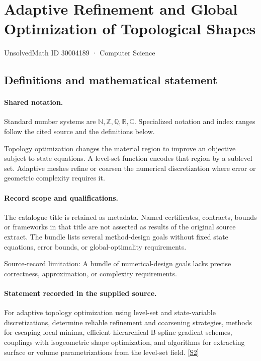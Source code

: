 \documentclass[11pt]{article}
\newcommand{\sref}[2]{\hyperlink{source:#1:#2}{[S#2]}}
\begin{document}
\setcounter{section}{30004188}
\section{Adaptive Refinement and Global Optimization of Topological Shapes}\label{30004189}
{\small\sffamily UnsolvedMath ID 30004189 · Computer Science}
\subsection{Definitions and mathematical statement}

\paragraph{Shared notation.}Standard number systems are $\mathbb N,\mathbb Z,\mathbb Q,\mathbb R,\mathbb C$. Specialized notation and index ranges follow the cited source and the definitions below.


Topology optimization changes the material region to improve an objective subject to state equations. A level-set function encodes that region by a sublevel set. Adaptive meshes refine or coarsen the numerical discretization where error or geometric complexity requires it.
\paragraph{Record scope and qualifications.}
The catalogue title is retained as metadata. Named certificates, contracts, bounds or frameworks in that title are not asserted as results of the original source extract.
The bundle lists several method-design goals without fixed state equations, error bounds, or global-optimality requirements.

Source-record limitation: A bundle of numerical-design goals lacks precise correctness, approximation, or complexity requirements.
\paragraph{Statement recorded in the supplied source.}
For adaptive topology optimization using level-set and state-variable discretizations, determine reliable refinement and coarsening strategies, methods for escaping local minima, efficient hierarchical B-spline gradient schemes, couplings with isogeometric shape optimization, and algorithms for extracting surface or volume parametrizations from the level-set field. \sref{30004189}{2}
\end{document}
